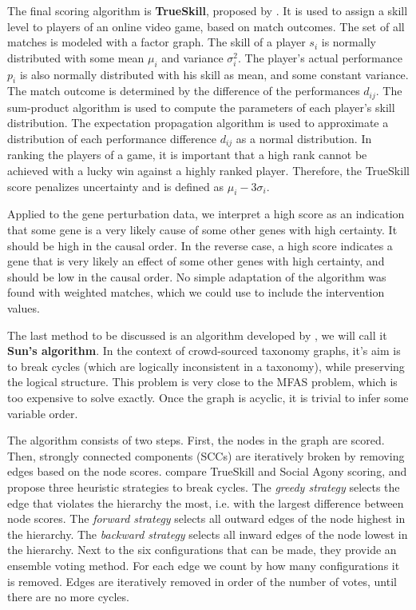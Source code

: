 The final scoring algorithm is \textbf{TrueSkill}, proposed by \citet{herbrich2007trueskill}. It is used to assign a skill level to players of an online video game, based on match outcomes. The set of all matches is modeled with a factor graph. The skill of a player $s_i$ is normally distributed with some mean $\mu_i$ and variance $\sigma_i^2$. The player's actual performance $p_i$ is also normally distributed with his skill as mean, and some constant variance. The match outcome is determined by the difference of the performances $d_{ij}$. The sum-product algorithm \citep{kschischang2001factor} is used to compute the parameters of each player's skill distribution. The expectation propagation algorithm \citep{minka2001family} is used to approximate a distribution of each performance difference $d_{ij}$ as a normal distribution. In ranking the players of a game, it is important that a high rank cannot be achieved with a lucky win against a highly ranked player. Therefore, the TrueSkill score penalizes uncertainty and is defined as $\mu_i - 3\sigma_i$. 

Applied to the gene perturbation data, we interpret a high score as an indication that some gene is a very likely cause of some other genes with high certainty. It should be high in the causal order. In the reverse case, a high score indicates a gene that is very likely an effect of some other genes with high certainty, and should be low in the causal order. No simple adaptation of the algorithm was found with weighted matches, which we could use to include the intervention values. 

The last method to be discussed is an algorithm developed by \citet{sun2017breaking}, we will call it \textbf{Sun's algorithm}. In the context of crowd-sourced taxonomy graphs, it's aim is to break cycles (which are logically inconsistent in a taxonomy), while preserving the logical structure. This problem is very close to the MFAS problem, which is too expensive to solve exactly. Once the graph is acyclic, it is trivial to infer some variable order.

The algorithm consists of two steps. First, the nodes in the graph are scored. Then, strongly connected components (SCCs) are iteratively broken by removing edges based on the node scores. \citet{sun2017breaking} compare TrueSkill and Social Agony scoring, and propose three heuristic strategies to break cycles. The \textit{greedy strategy} selects the edge that violates the hierarchy the most, i.e. with the largest difference between node scores. The \textit{forward strategy} selects all outward edges of the node highest in the hierarchy. The \textit{backward strategy} selects all inward edges of the node lowest in the hierarchy. Next to the six configurations that can be made, they provide an ensemble voting method. For each edge we count by how many configurations it is removed. Edges are iteratively removed in order of the number of votes, until there are no more cycles. 

